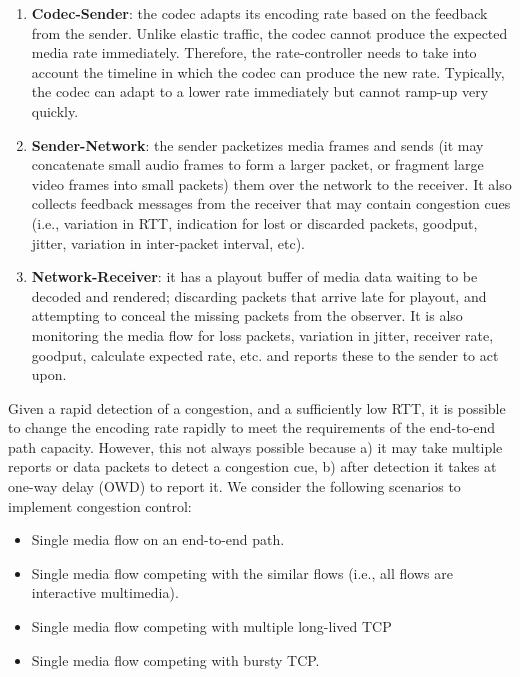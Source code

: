 \begin{enumerate}

\item \textbf{Codec-Sender}: the codec adapts its encoding rate based on the feedback
from the sender. Unlike elastic traffic, the codec cannot produce the expected
media rate immediately. Therefore, the rate-controller needs to take into
account the timeline in which the codec can produce the new rate. Typically,
the codec can adapt to a lower rate immediately but cannot ramp-up very
quickly.

\item \textbf{Sender-Network}: the sender packetizes media frames and sends
(it may concatenate small audio frames to form a larger packet, or fragment
large video frames into small packets) them over the network to the receiver.
It also collects feedback messages from the receiver that may contain
congestion cues (i.e., variation in RTT, indication for lost or discarded
packets, goodput, jitter, variation in inter-packet interval, etc).

\item \textbf{Network-Receiver}: it has a playout buffer of media data waiting
to be decoded and rendered; discarding packets that arrive late for playout,
and attempting to conceal the missing packets from the observer. It is  also
monitoring the media flow for loss packets, variation in jitter, receiver
rate, goodput, calculate expected rate, etc. and reports these to the sender
to act upon.

\end{enumerate}

Given a rapid detection of a congestion, and a sufficiently low RTT, it is
possible to change the encoding rate rapidly to meet the requirements of the
end-to-end path capacity. However, this not always possible because a)
it may take multiple reports or data packets to detect a congestion cue, b)
after detection it takes at one-way delay (OWD) to report it. We consider the 
following scenarios to implement congestion control:

\begin{itemize}
\item Single media flow on an end-to-end path.
\item Single media flow competing with the similar flows (i.e., all flows are
interactive multimedia).
\item Single media flow competing with multiple long-lived TCP
\item Single media flow competing with bursty TCP.
\end{itemize}

